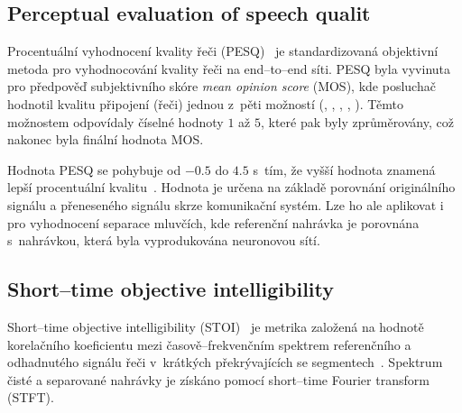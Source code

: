 


\subsection{Perceptual evaluation of speech qualit}
Procentuální vyhodnocení kvality řeči (PESQ)~\cite{pesq-itut} je standardizovaná objektivní metoda pro vyhodnocování kvality řeči na end--to--end síti. PESQ byla vyvinuta pro předpověď subjektivního skóre \textit{mean opinion score} (MOS), kde posluchač hodnotil kvalitu připojení (řeči) jednou z~pěti možností (, , , , ). Těmto možnostem odpovídaly číselné hodnoty $1$ až $5$, které pak byly zprůměrovány, což nakonec byla finální hodnota MOS.

Hodnota PESQ se pohybuje od $-0.5$ do $4.5$ s~tím, že vyšší hodnota znamená lepší procentuální kvalitu~\cite{sdr-pesq-optimization}. Hodnota je určena na základě porovnání originálního signálu a přeneseného signálu skrze komunikační systém. Lze ho ale aplikovat i pro vyhodnocení separace mluvčích, kde referenční nahrávka je porovnána s~nahrávkou, která byla vyprodukována neuronovou sítí.





\subsection{Short--time objective intelligibility}
Short--time objective intelligibility (STOI)~\cite{taal-stoi} je metrika založená na hodnotě korelačního koeficientu mezi časově--frekvenčním spektrem referenčního a odhadnutého signálu řeči v~krátkých překrývajících se segmentech~\cite{5713237}. Spektrum čisté a separované nahrávky je získáno pomocí short--time Fourier transform (STFT).

